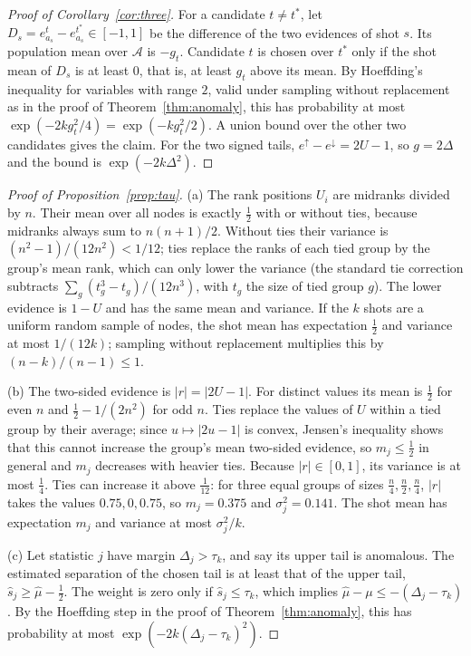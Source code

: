 \documentclass[pdflatex,sn-mathphys-ay]{sn-jnl}
\theoremstyle{plain}
\theoremstyle{remark}
\begin{document}
\begin{appendices}
\begin{proof}[Proof of Corollary~\ref{cor:three}]
For a candidate $t \ne t^*$, let $D_s = e^{t}_{a_s} - e^{t^*}_{a_s} \in [-1,1]$ be the difference of the two evidences of shot $s$. Its population mean over $\mathcal{A}$ is $-g_t$. Candidate $t$ is chosen over $t^*$ only if the shot mean of $D_s$ is at least $0$, that is, at least $g_t$ above its mean. By Hoeffding's inequality for variables with range $2$, valid under sampling without replacement as in the proof of Theorem~\ref{thm:anomaly}, this has probability at most $\exp(-2k g_t^2/4) = \exp(-k g_t^2/2)$. A union bound over the other two candidates gives the claim. For the two signed tails, $e^{\uparrow} - e^{\downarrow} = 2U - 1$, so $g = 2\Delta$ and the bound is $\exp(-2k\Delta^2)$.
\end{proof}

\begin{proof}[Proof of Proposition~\ref{prop:tau}]
(a) The rank positions $U_i$ are midranks divided by $n$. Their mean over all nodes is exactly $\tfrac12$ with or without ties, because midranks always sum to $n(n+1)/2$. Without ties their variance is $(n^2-1)/(12n^2) < 1/12$; ties replace the ranks of each tied group by the group's mean rank, which can only lower the variance (the standard tie correction subtracts $\sum_g (t_g^3 - t_g)/(12n^3)$, with $t_g$ the size of tied group $g$). The lower evidence is $1-U$ and has the same mean and variance. If the $k$ shots are a uniform random sample of nodes, the shot mean has expectation $\tfrac12$ and variance at most $1/(12k)$; sampling without replacement multiplies this by $(n-k)/(n-1) \le 1$.

(b) The two-sided evidence is $|r| = |2U-1|$. For distinct values its mean is $\tfrac12$ for even $n$ and $\tfrac12 - 1/(2n^2)$ for odd $n$. Ties replace the values of $U$ within a tied group by their average; since $u \mapsto |2u-1|$ is convex, Jensen's inequality shows that this cannot increase the group's mean two-sided evidence, so $m_j \le \tfrac12$ in general and $m_j$ decreases with heavier ties. Because $|r| \in [0,1]$, its variance is at most $\tfrac14$. Ties can increase it above $\tfrac1{12}$: for three equal groups of sizes $\tfrac n4, \tfrac n2, \tfrac n4$, $|r|$ takes the values $0.75, 0, 0.75$, so $m_j = 0.375$ and $\sigma_j^2 = 0.141$. The shot mean has expectation $m_j$ and variance at most $\sigma_j^2/k$.

(c) Let statistic $j$ have margin $\Delta_j > \tau_k$, and say its upper tail is anomalous. The estimated separation of the chosen tail is at least that of the upper tail, $\hat s_j \ge \hat\mu - \tfrac12$. The weight is zero only if $\hat s_j \le \tau_k$, which implies $\hat\mu - \mu \le -(\Delta_j - \tau_k)$. By the Hoeffding step in the proof of Theorem~\ref{thm:anomaly}, this has probability at most $\exp(-2k(\Delta_j - \tau_k)^2)$.
\end{proof}


\end{appendices}
\end{document}
